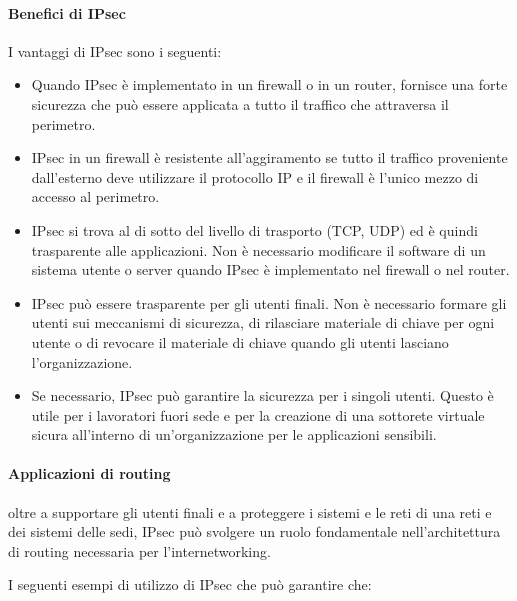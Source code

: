 \paragraph{Benefici di IPsec}
I vantaggi di IPsec sono i seguenti:
\begin{itemize}
    \item Quando IPsec è implementato in un firewall o in un router, fornisce una forte sicurezza che può essere applicata a tutto il traffico che attraversa il perimetro.
    
    \item IPsec in un firewall è resistente all'aggiramento se tutto il traffico proveniente dall'esterno deve utilizzare il protocollo IP e il firewall è l'unico mezzo di accesso al perimetro.
    
    \item IPsec si trova al di sotto del livello di trasporto (TCP, UDP) ed è quindi trasparente alle applicazioni.
     Non è necessario modificare il software di un sistema utente o server quando IPsec è implementato nel firewall o nel router.
     
    \item IPsec può essere trasparente per gli utenti finali. Non è necessario formare gli utenti sui meccanismi di sicurezza, di rilasciare materiale di chiave per ogni utente o di revocare il materiale di chiave quando gli utenti lasciano l'organizzazione.
     
    \item Se necessario, IPsec può garantire la sicurezza per i singoli utenti. Questo è utile per i lavoratori fuori sede e per la creazione di una sottorete virtuale sicura all'interno di un'organizzazione per le applicazioni sensibili.
\end{itemize}
\paragraph{Applicazioni di routing} oltre a supportare gli utenti finali e a proteggere i sistemi e le reti di una
reti e dei sistemi delle sedi, IPsec può svolgere un ruolo fondamentale nell'architettura di routing necessaria per l'internetworking.  

\singlespacing

I seguenti esempi di utilizzo di IPsec che può garantire che:

